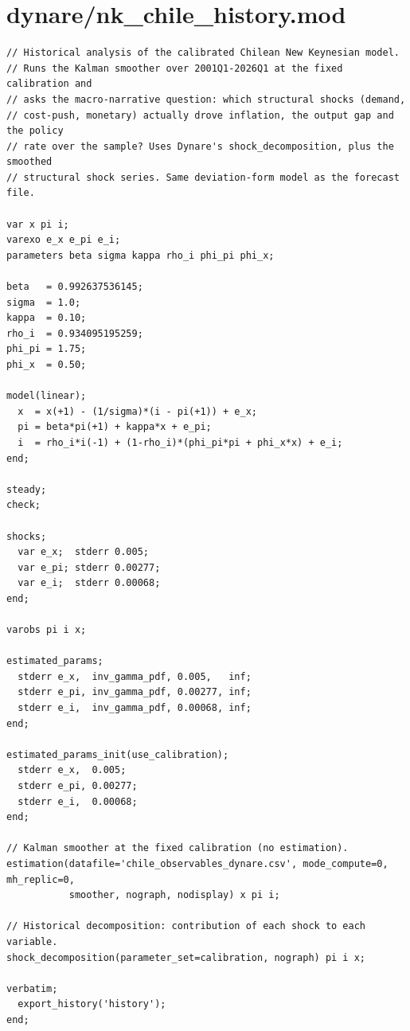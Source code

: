 \documentclass[9pt]{extarticle}
\begin{document}
\section{dynare/nk\_chile\_history.mod}
\begin{lstlisting}[language={}]
// Historical analysis of the calibrated Chilean New Keynesian model.
// Runs the Kalman smoother over 2001Q1-2026Q1 at the fixed calibration and
// asks the macro-narrative question: which structural shocks (demand,
// cost-push, monetary) actually drove inflation, the output gap and the policy
// rate over the sample? Uses Dynare's shock_decomposition, plus the smoothed
// structural shock series. Same deviation-form model as the forecast file.

var x pi i;
varexo e_x e_pi e_i;
parameters beta sigma kappa rho_i phi_pi phi_x;

beta   = 0.992637536145;
sigma  = 1.0;
kappa  = 0.10;
rho_i  = 0.934095195259;
phi_pi = 1.75;
phi_x  = 0.50;

model(linear);
  x  = x(+1) - (1/sigma)*(i - pi(+1)) + e_x;
  pi = beta*pi(+1) + kappa*x + e_pi;
  i  = rho_i*i(-1) + (1-rho_i)*(phi_pi*pi + phi_x*x) + e_i;
end;

steady;
check;

shocks;
  var e_x;  stderr 0.005;
  var e_pi; stderr 0.00277;
  var e_i;  stderr 0.00068;
end;

varobs pi i x;

estimated_params;
  stderr e_x,  inv_gamma_pdf, 0.005,   inf;
  stderr e_pi, inv_gamma_pdf, 0.00277, inf;
  stderr e_i,  inv_gamma_pdf, 0.00068, inf;
end;

estimated_params_init(use_calibration);
  stderr e_x,  0.005;
  stderr e_pi, 0.00277;
  stderr e_i,  0.00068;
end;

// Kalman smoother at the fixed calibration (no estimation).
estimation(datafile='chile_observables_dynare.csv', mode_compute=0, mh_replic=0,
           smoother, nograph, nodisplay) x pi i;

// Historical decomposition: contribution of each shock to each variable.
shock_decomposition(parameter_set=calibration, nograph) pi i x;

verbatim;
  export_history('history');
end;
\end{lstlisting}
\clearpage
\end{document}
